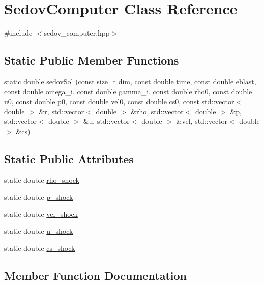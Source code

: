 \hypertarget{classSedovComputer}{}\section{Sedov\+Computer Class Reference}
\label{classSedovComputer}


{\ttfamily \#include $<$sedov\+\_\+computer.\+hpp$>$}

\subsection*{Static Public Member Functions}
\begin{DoxyCompactItemize}
\item 
static double \mbox{\hyperlink{classSedovComputer_a5aa65182382334ed24bf803e60967795}{sedov\+Sol}} (const size\+\_\+t dim, const double time, const double eblast, const double omega\+\_\+i, const double gamma\+\_\+i, const double rho0, const double \mbox{\hyperlink{init_8cpp_aea69f0325091359ce926f389279d7cb5}{u0}}, const double p0, const double vel0, const double cs0, const std\+::vector$<$ double $>$ \&r, std\+::vector$<$ double $>$ \&rho, std\+::vector$<$ double $>$ \&p, std\+::vector$<$ double $>$ \&u, std\+::vector$<$ double $>$ \&vel, std\+::vector$<$ double $>$ \&cs)
\end{DoxyCompactItemize}
\subsection*{Static Public Attributes}
\begin{DoxyCompactItemize}
\item 
static double \mbox{\hyperlink{classSedovComputer_a3a79b1c2c435337f92488129f15ad323}{rho\+\_\+shock}}
\item 
static double \mbox{\hyperlink{classSedovComputer_aaca1a1a129526f6861d9c219a025ed56}{p\+\_\+shock}}
\item 
static double \mbox{\hyperlink{classSedovComputer_ac8e574be46eb693b095e85c5d157bffb}{vel\+\_\+shock}}
\item 
static double \mbox{\hyperlink{classSedovComputer_a597b5c8321e0737b514ddb121844053d}{u\+\_\+shock}}
\item 
static double \mbox{\hyperlink{classSedovComputer_afd12699016e5eb9bc8c2c42ca4fb00bd}{cs\+\_\+shock}}
\end{DoxyCompactItemize}


\subsection{Member Function Documentation}
\mbox{\label{classSedovComputer_a5aa65182382334ed24bf803e60967795}} 
